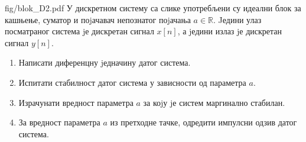 \begin{slikaDesno}{fig/blok_D2.pdf}
    \PID У дискретном систему са слике употребљени су идеални блок за кашњење,
    суматор и поjачавач непознатог поjачања $a \in \mathbb R$. 
    Jедини улаз посматраног
    система jе дискретан сигнал $x[n]$, а jедини излаз jе дискретан сигнал $y[n]$.
\end{slikaDesno}
\begin{enumerate}[label=(\alph*)]
    \item Написати диференцну jедначину датог система.
    \item Испитати  стабилност датог система у зависности од параметра $a$.
    \item Израчунати вредност параметра $a$ за коjу jе систем маргинално стабилан.
    \item За вредност параметра $a$ из претходне тачке, одредити импулсни одзив
    датог система.
\end{enumerate}

